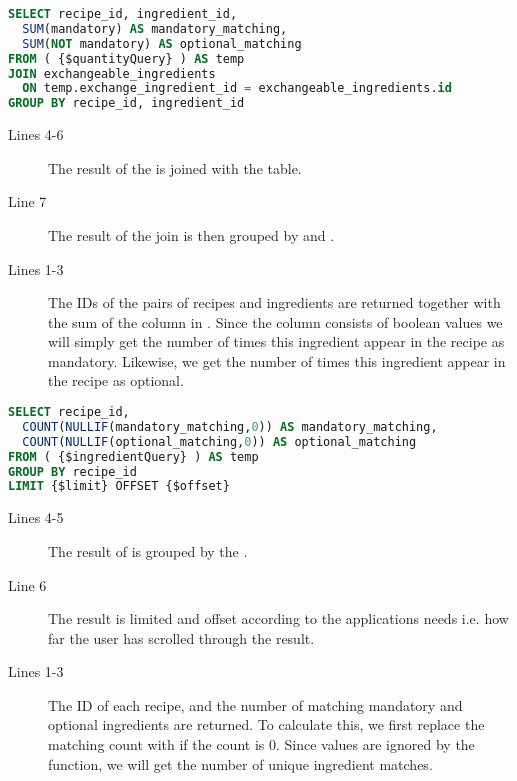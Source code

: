 \begin{lstlisting}[language=SQL, float=h, label={}, caption={\$ingredientQuery, get the number of times the individual ingredients appear in each recipe.}]
SELECT recipe_id, ingredient_id,
  SUM(mandatory) AS mandatory_matching,
  SUM(NOT mandatory) AS optional_matching
FROM ( {$quantityQuery} ) AS temp
JOIN exchangeable_ingredients
  ON temp.exchange_ingredient_id = exchangeable_ingredients.id
GROUP BY recipe_id, ingredient_id
\end{lstlisting}

\begin{description}
\item[Lines 4-6] The result of the  is joined with the  table.
\item[Line 7] The result of the join is then grouped by  and .
\item[Lines 1-3] The IDs of the pairs of recipes and ingredients are returned together with the sum of the  column in . Since the  column consists of boolean values we will simply get the number of times this ingredient appear in the recipe as mandatory. Likewise, we get the number of times this ingredient appear in the recipe as optional.
\end{description}



\begin{lstlisting}[language=SQL, morekeywords={OFFSET}, float=h, label={}, caption={\$matchingQuery, get the matching ingredients count.}]
SELECT recipe_id,
  COUNT(NULLIF(mandatory_matching,0)) AS mandatory_matching,
  COUNT(NULLIF(optional_matching,0)) AS optional_matching
FROM ( {$ingredientQuery} ) AS temp
GROUP BY recipe_id
LIMIT {$limit} OFFSET {$offset}
\end{lstlisting}

\begin{description}
\item[Lines 4-5] The result of  is grouped by the .
\item[Line 6] The result is limited and offset according to the applications needs i.e. how far the user has scrolled through the result.
\item[Lines 1-3] The ID of each recipe, and the number of matching mandatory and optional ingredients are returned. To calculate this, we first replace the matching count with  if the count is 0. Since  values are ignored by the  function, we will get the number of unique ingredient matches.
\end{description}



